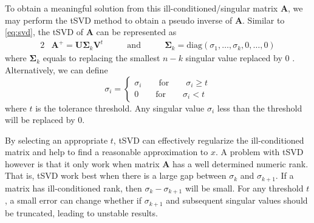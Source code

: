 			To obtain a meaningful solution from this ill-conditioned/singular matrix $\boldsymbol{A}$, we may perform the \gls{tSVD} method to obtain a pseudo inverse of $\boldsymbol{A}$.
			Similar to \cref{eq:svd}, the \gls{tSVD} of $\boldsymbol{A}$ can be represented as 
			\begin{alignat}{2}
				&\boldsymbol{A}^+ = \boldsymbol{U\Sigma}_k\boldsymbol{V}^t  &\qquad\text{and}\qquad  &\boldsymbol{\Sigma}_k=\mathrm{diag}(\sigma_1,\dots,\sigma_k,0,\dots,0)
				\label{eq:tsvd}				
			\end{alignat}
			where $\boldsymbol{\Sigma}_k$ equals to replacing the smallest $n-k$ singular value replaced by 0 \citep{Hansen1987}. 
			Alternatively, we can define
			\begin{equation}
			\sigma_i=\begin{cases}
			\sigma_i\qquad\text{for}\qquad\sigma_i\ge t\\
			0\qquad\text{for}\qquad\sigma_i<t
			\end{cases}
			\end{equation}
			where $t$ is the tolerance threshold. 
			Any singular value $\sigma_i$ less than the threshold will be replaced by 0. 
			
			By selecting an appropriate $t$, \gls{tSVD} can effectively regularize the ill-conditioned matrix and help to find a reasonable approximation to $x$. 
			A problem with \gls{tSVD} however is that it only work when matrix $\boldsymbol{A}$ has a well determined numeric rank\citep{Hansen1987}.
			That is, \gls{tSVD} work best when there is a large gap between $\sigma_k$ and $\sigma_{k+1}$.
			If a matrix has ill-conditioned rank, then $\sigma_k-\sigma_{k+1}$ will be small.
			For any threshold $t$, a small error can change whether if $\sigma_{k+1}$ and subsequent singular values should be truncated, leading to unstable results. 
			
